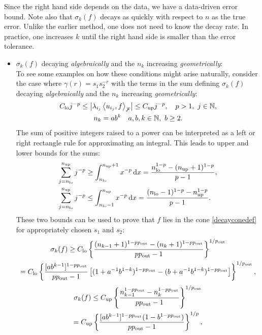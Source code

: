 \documentclass[final]{elsarticle}
\newcommand{\pout}{p_{\text{\rm{out}}}}
\theoremstyle{definition}
\theoremstyle{remark}
\DeclareMathOperator{\up}{up}
\DeclareMathOperator{\lo}{lo}
\begin{document}
Since the right hand side depends on the data, we have a data-driven error bound.  Note also that $\sigma_k(f)$ decays as quickly with respect to $n$ as the true error.  Unlike the earlier method, one does not need to know the decay rate.  In practice, one increases $k$ until the right hand side is smaller than the error tolerance.
\begin{itemize}
\item  $\sigma_k(f)$ decaying \emph{algebraically} and the $n_k$ increasing \emph{geometrically}:\\


To see some examples on how these conditions might arise naturally, consider the case where $\gamma(r)=s_1s_2^{-r}$ with the terms in the sum defining $\sigma_k(f)$ decaying \emph{algebraically} and the $n_k$ increasing \emph{geometrically}:
\begin{gather*}
C_{\lo} j^{-p} \le \abs{\lambda_{i_j} \ip[\cf]{u_{i_j}}{f}} \le C_{\up} j^{-p}, \quad  p>1, \ j \in \naturals, \\
n_k = a b^k  \quad a, b, k \in \naturals, \ b \ge 2.
\end{gather*}
The sum of positive integers raised to a power can be interpreted as a left or right rectangle rule for approximating an integral.  This leads to upper and lower bounds for the sums:
\begin{align*}
\sum_{j=n_{\lo}}^{n_{\up}} j^{-p}  & \ge \int_{n_{\lo}}^{n_{\up}+1} x^{-p}\, \dif x  = \frac{n_{\lo} ^{1-p} - (n_{\up}+1)^{1-p}}{p-1}, \\
\sum_{j=n_{\lo}}^{n_{\up}} j^{-p}  & \le \int_{n_{\lo}-1}^{n_{\up}} x^{-p}\, \dif x = \frac{(n_{\lo}-1) ^{1-p} - n_{\up}^{1-p}}{p-1}.
\end{align*}
These two bounds can be used to prove that $f$ lies in the cone \eqref{decayconedef} for appropriately chosen $s_1$ and $s_2$:
\begin{multline*}
\sigma_k(f) \ge C_{\lo} \left\{\frac{(n_{k-1}+1) ^{1-p\pout} - (n_{k}+1)^{1-p \pout}}{p \pout-1}\right\}^{1/\pout} \\
= C_{\lo} \left\{\frac{[ab^{k-1}]^{1-p \pout}}{p \pout-1} \left[(1+a^{-1}b^{1-k})^{1-p \pout} - (b+a^{-1}b^{1-k})^{1-p \pout}\right] \right\}^{1/\pout},
\end{multline*}
\begin{multline*}
\sigma_k(f) \le C_{\up}\left\{\frac{n_{k-1} ^{1-p \pout} - n_{k}^{1-p \pout}}{p \pout-1}\right\}^{1/\pout} \\
= C_{\up}\left\{\frac{[ab^{k-1}]^{1-p \pout} (1 - b^{1-p \pout})}{p \pout-1}\right\}^{1/p} ,

\end{multline*}
\end{itemize}
\end{document}
